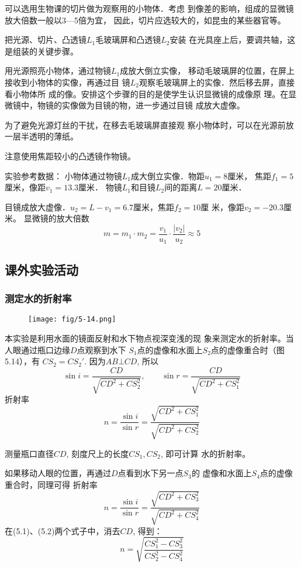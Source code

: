 可以选用生物课的切片做为观察用的小物体．考虑
到像差的影响，组成的显微镜放大倍数一般以3—5倍为宜，
因此，切片应选较大的，如昆虫的某些器官等。

把光源、切片、凸透镜$L_1$毛玻璃屏和凸透镜$L_2$安装
在光具座上后，要调共轴，这是组装的关键步骤。

用光源照亮小物体，通过物镜$L_1$成放大倒立实像，
移动毛玻璃屏的位置，在屏上接收到小物体的实像，再通过目
镜$L_2$观察毛玻璃屏上的实像．然后移去屏，直接看小物体所
成的像。安排这个步骤的目的是使学生认识显微镜的成像原
理。在显微镜中，物镜的实像做为目镜的物，进一步通过目镜
成放大虚像。

为了避免光源灯丝的干扰，在移去毛玻璃屏直接观
察小物体时，可以在光源前放一层半透明的薄纸。

注意使用焦距较小的凸透镜作物镜。

实验参考数据：
小物体通过物镜$L_1$成大倒立实像．物距$u_1=8$厘米，
焦距$f_1=5$厘米，像距$v_1=13.3$厘米．
物镜$L_1$和目镜$L_2$间的距离$L=20$厘米．

目镜成放大虚像．$u_2=L-v_1=6.7$厘米，焦距$f_2=10$厘
米，像距$v_2=-20.3$厘米。
显微镜的放大倍数$$m=m_1\cdot m_2=\frac{v_1}{u_1}\cdot \frac{|v_2|}{u_2}\approx 5$$

\subsection{课外实验活动}
\subsubsection{测定水的折射率}
\begin{figure}[htp]
    \centering
    \texttt{[image: fig/5-14.png]}
    \caption{}
\end{figure}

本实验是利用水面的镜面反射和水下物点视深变浅的现
象来测定水的折射率。当人眼通过瓶口边缘$D$点观察到水下
$S_1$点的虚像和水面上$S_2$点的虚像重合时（图5.14），有
$CS_2=CS_2'$.
因为$AB\bot CD$, 所以
\[\sin i=\frac{CD}{\sqrt{CD^2+CS_2^2}},\qquad \sin r=\frac{CD}{\sqrt{CD^2+CS_1^2}}\]
折射率
\begin{equation}
    n=\frac{\sin i}{\sin r}=\frac{\sqrt{CD^2+CS_1^2}}{\sqrt{CD^2+CS_2^2}}
\end{equation}

测量瓶口直径$CD$, 刻度尺上的长度$CS_1,CS_2$, 即可计算
水的折射率。

如果移动人眼的位置，再通过$D$点看到水下另一点$S_3$的
虚像和水面上$S_4$点的虚像重合时，同理可得
折射率
\begin{equation}
    n=\frac{\sin i}{\sin r}=\frac{\sqrt{CD^2+CS_3^2}}{\sqrt{CD^2+CS_4^2}}
\end{equation}
在(5.1)、(5.2)两个式子中，消去$CD$, 得到：
\[n=\sqrt{\frac{CS_1^2-CS_3^2}{CS_2^2-CS_4^2}}\]

